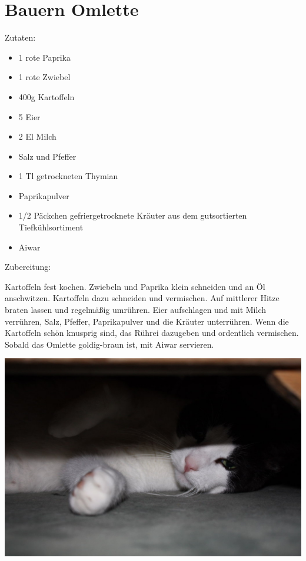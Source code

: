\section{Bauern Omlette}
Zutaten:
\begin{itemize}
    \item 1 rote Paprika
    \item 1 rote Zwiebel
    \item 400g Kartoffeln
    \item 5 Eier
    \item 2 El Milch
    \item Salz und Pfeffer
    \item 1 Tl getrockneten Thymian
    \item Paprikapulver
	\item 1/2 Päckchen gefriergetrocknete Kräuter aus dem gutsortierten
		Tiefkühlsortiment
    \item Aiwar
\end{itemize}

\noindent Zubereitung:

\noindent Kartoffeln fest kochen. Zwiebeln und Paprika klein schneiden und an
Öl anschwitzen. Kartoffeln dazu schneiden und vermischen. Auf mittlerer Hitze
braten lassen und regelmäßig umrühren. Eier aufschlagen und mit Milch
verrühren, Salz, Pfeffer, Paprikapulver und die Kräuter unterrühren. Wenn die
Kartoffeln schön knusprig sind, das Rührei dazugeben und ordentlich vermischen.
Sobald das Omlette goldig-braun ist, mit Aiwar servieren.

\newpage
\mbox{}
\vfill
\begin{center}
    \includegraphics[width=\textwidth]{Bauern-Omlette/IMG_0885._small.jpg}
\end{center}
\vfill
\mbox{ }
\newpage
